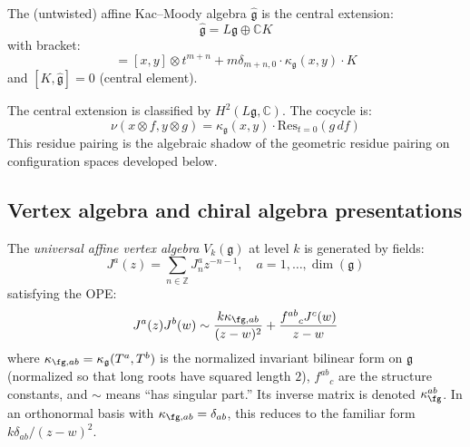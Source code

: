 \begin{definition}\label{def:affine-kac-moody}
The (untwisted) affine Kac--Moody algebra $\widehat{\mathfrak{g}}$ is the central extension:
\begin{equation}
\widehat{\mathfrak{g}} = L\mathfrak{g} \oplus \mathbb{C} K
\end{equation}
with bracket:
\begin{equation}
[x \otimes t^m, y \otimes t^n] = [x,y] \otimes t^{m+n} + m \delta_{m+n,0} \cdot \kappa_{\mathfrak{g}}(x,y) \cdot K
\end{equation}
and $[K, \widehat{\mathfrak{g}}] = 0$ (central element).
\end{definition}

\begin{remark}
The central extension is classified by $H^2(L\mathfrak{g}, \mathbb{C})$. The cocycle is:
\begin{equation}
\nu(x \otimes f, y \otimes g) = \kappa_{\mathfrak{g}}(x,y) \cdot \mathrm{Res}_{t=0}(g \, df)
\end{equation}
This residue pairing is the algebraic shadow of the geometric residue pairing on configuration spaces developed below.
\end{remark}

\subsection{Vertex algebra and chiral algebra presentations}

\begin{definition}
The \emph{universal affine vertex algebra} $V_k(\mathfrak{g})$ at level $k$ is generated by fields:
\begin{equation}
J^a(z) = \sum_{n \in \mathbb{Z}} J^a_n z^{-n-1}, \quad a = 1,\ldots,\dim(\mathfrak{g})
\end{equation}
satisfying the OPE:
\begin{equation}\label{eq:affine-kac-moody-ope}
J^a(z) J^b(w) \sim
\frac{k \kappa_{\fg,ab}}{(z-w)^2}
+ \frac{{f^{ab}}_c J^c(w)}{z-w}
\end{equation}
where $\kappa_{\fg,ab} = \kappa_{\mathfrak{g}}(T^a, T^b)$ is the
normalized invariant bilinear form on $\mathfrak{g}$ (normalized so
that long roots have squared length $2$), ${f^{ab}}_c$ are the
structure constants, and $\sim$ means ``has singular part.'' Its
inverse matrix is denoted $\kappa_{\fg}^{ab}$. In an orthonormal
basis with $\kappa_{\fg,ab} = \delta_{ab}$, this reduces to the
familiar form $k\delta_{ab}/(z-w)^2$.
\end{definition}

